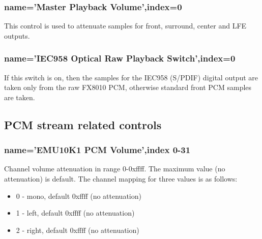 \documentclass[a4paper,8pt,english]{sphinxmanual}
\begin{document}
\subsubsection{name='Master Playback Volume',index=0}
\label{sound/cards/audigy-mixer:name-master-playback-volume-index-0}
This control is used to attenuate samples for front, surround, center and
LFE outputs.


\subsubsection{name='IEC958 Optical Raw Playback Switch',index=0}
\label{sound/cards/audigy-mixer:name-iec958-optical-raw-playback-switch-index-0}
If this switch is on, then the samples for the IEC958 (S/PDIF) digital
output are taken only from the raw FX8010 PCM, otherwise standard front
PCM samples are taken.


\subsection{PCM stream related controls}
\label{sound/cards/audigy-mixer:pcm-stream-related-controls}

\subsubsection{name='EMU10K1 PCM Volume',index 0-31}
\label{sound/cards/audigy-mixer:name-emu10k1-pcm-volume-index-0-31}
Channel volume attenuation in range 0-0xffff. The maximum value (no
attenuation) is default. The channel mapping for three values is
as follows:
\begin{itemize}
\item {} 
0 - mono, default 0xffff (no attenuation)

\item {} 
1 - left, default 0xffff (no attenuation)

\item {} 
2 - right, default 0xffff (no attenuation)

\end{itemize}
\end{document}
